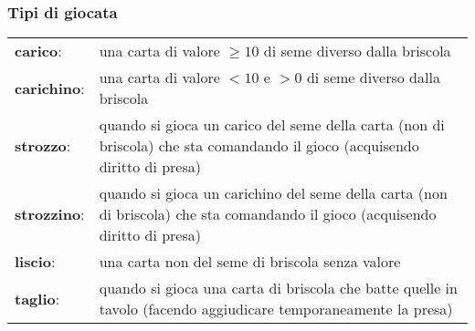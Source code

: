 \subsubsection*{Tipi di giocata}
\vspace{4mm}
\begin{tabular}{l p{}}
\textbf{carico}: & una carta di valore $  \geq 10 $ di seme diverso dalla briscola \\
\textbf{carichino}: & una carta di valore $  < 10 $ e $ > 0 $ di seme diverso dalla briscola \\
\textbf{strozzo}: & quando si gioca un carico del seme della carta (non di briscola) che sta comandando il gioco (acquisendo diritto di presa) \\
\textbf{strozzino}: & quando si gioca un carichino del seme della carta (non di briscola) che sta comandando il gioco (acquisendo diritto di presa) \\
\textbf{liscio}: & una carta non del seme di briscola senza valore \\
\textbf{taglio}: & quando si gioca una carta di briscola che batte quelle in tavolo (facendo aggiudicare temporaneamente la presa) \\

\end{tabular}

